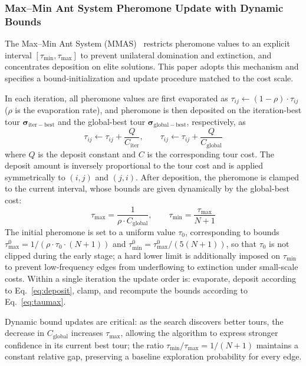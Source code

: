 \documentclass[pdflatex,sn-basic,Numbered]{sn-jnl}
\begin{document}
\subsubsection{Max--Min Ant System Pheromone Update with Dynamic Bounds}

The Max--Min Ant System (MMAS)~\cite{ref23} restricts pheromone values to an explicit interval $[\tau_{\min}, \tau_{\max}]$ to prevent unilateral domination and extinction, and concentrates deposition on elite solutions. This paper adopts this mechanism and specifies a bound-initialization and update procedure matched to the cost scale.

In each iteration, all pheromone values are first evaporated as $\tau_{ij} \leftarrow (1 - \rho) \cdot \tau_{ij}$ ($\rho$ is the evaporation rate), and pheromone is then deposited on the iteration-best tour $\bm{\sigma}_{\mathrm{iter-best}}$ and the global-best tour $\bm{\sigma}_{\mathrm{global-best}}$, respectively, as
\begin{equation}
\tau_{ij} \leftarrow \tau_{ij} + \frac{Q}{C_{\mathrm{iter}}}, \qquad
\tau_{ij} \leftarrow \tau_{ij} + \frac{Q}{C_{\mathrm{global}}}
\label{eq:deposit}
\end{equation}
where $Q$ is the deposit constant and $C$ is the corresponding tour cost. The deposit amount is inversely proportional to the tour cost and is applied symmetrically to $(i,j)$ and $(j,i)$. After deposition, the pheromone is clamped to the current interval, whose bounds are given dynamically by the global-best cost:
\begin{equation}
\tau_{\max} = \frac{1}{\rho \cdot C_{\mathrm{global}}}, \qquad
\tau_{\min} = \frac{\tau_{\max}}{N+1}
\label{eq:taumax}
\end{equation}
The initial pheromone is set to a uniform value $\tau_0$, corresponding to bounds $\tau_{\max}^{0} = 1/(\rho \cdot \tau_0 \cdot (N+1))$ and $\tau_{\min}^{0} = \tau_{\max}^{0}/(5(N+1))$, so that $\tau_0$ is not clipped during the early stage; a hard lower limit is additionally imposed on $\tau_{\min}$ to prevent low-frequency edges from underflowing to extinction under small-scale costs. Within a single iteration the update order is: evaporate, deposit according to Eq.~\eqref{eq:deposit}, clamp, and recompute the bounds according to Eq.~\eqref{eq:taumax}.

Dynamic bound updates are critical: as the search discovers better tours, the decrease in $C_{\mathrm{global}}$ increases $\tau_{\max}$, allowing the algorithm to express stronger confidence in its current best tour; the ratio $\tau_{\min}/\tau_{\max} = 1/(N+1)$ maintains a constant relative gap, preserving a baseline exploration probability for every edge.
\end{document}

